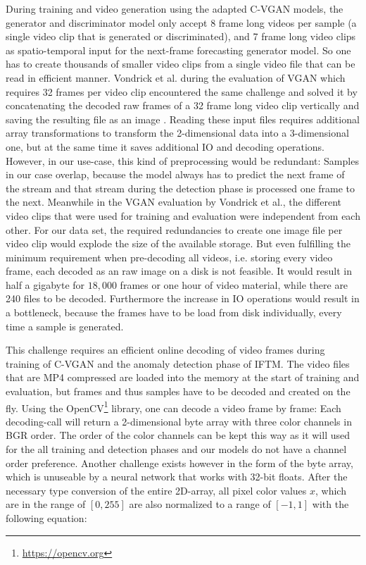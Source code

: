 During training and video generation using the adapted C-VGAN models, the generator and discriminator model only accept 8 frame long videos per sample (a single video clip that is generated or discriminated), and 7 frame long video clips as spatio-temporal input for the next-frame forecasting generator model. So one has to create thousands of smaller video clips from a single video file that can be read in efficient manner. Vondrick et al. during the evaluation of VGAN which requires 32 frames per video clip encountered the same challenge and solved it by concatenating the decoded raw frames of a 32 frame long video clip vertically and saving the resulting file as an image \cite{vondrick2016generating}. Reading these input files requires additional array transformations to transform the 2-dimensional data into a 3-dimensional one, but at the same time it saves additional IO and decoding operations. However, in our use-case, this kind of preprocessing would be redundant: Samples in our case overlap, because the model always has to predict the next frame of the stream and that stream during the detection phase is processed one frame to the next. Meanwhile in the VGAN evaluation by Vondrick et al., the different video clips that were used for training and evaluation were independent from each other. For our data set, the required redundancies to create one image file per video clip would explode the size of the available storage. But even fulfilling the minimum requirement when pre-decoding all videos, i.e. storing every video frame, each decoded as an raw image on a disk is not feasible. It would result in half a gigabyte for $18,000$ frames or one hour of video material, while there are 240 files to be decoded. Furthermore the increase in IO operations would result in a bottleneck, because the frames have to be load from disk individually, every time a sample is generated.

This challenge requires an efficient online decoding of video frames during training of C-VGAN and the anomaly detection phase of IFTM. The video files that are MP4 compressed are loaded into the memory at the start of training and evaluation, but frames and thus samples have to be decoded and created on the fly. Using the OpenCV\footnote{\url{https://opencv.org}} library, one can decode a video frame by frame: Each decoding-call will return a 2-dimensional byte array with three color channels in BGR order. The order of the color channels can be kept this way as it will used for the all training and detection phases and our models do not have a channel order preference. Another challenge exists however in the form of the byte array, which is unuseable by a neural network that works with 32-bit floats. After the necessary type conversion of the entire 2D-array, all pixel color values $x$, which are in the range of $[0, 255]$ are also normalized to a range of $[-1, 1]$ with the following equation:

